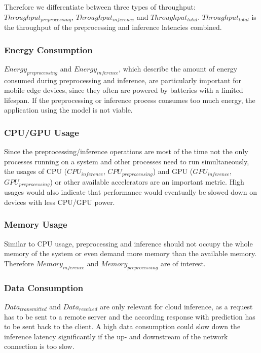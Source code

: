 Therefore we differentiate between three types of throughput: $Throughput_{preprocessing}$, $Throughput_{inference}$ and $Throughput_{total}$.
$Throughput_{total}$ is the throughput of the preprocessing and inference latencies combined.



\subsubsection{Energy Consumption}
$Energy_{preprocessing}$ and $Energy_{inference}$, which describe the amount of energy consumed during preprocessing and inference, are particularly important for mobile edge devices, since they often are powered by batteries with a limited lifespan. If the preprocessing or inference process consumes too much energy, the application using the model is not viable.


\subsubsection{CPU/GPU Usage}
Since the preprocessing/inference operations are most of the time not the only processes running on a system and other processes need to run simultaneously, the usages of CPU ($CPU_{inference}$, $CPU_{preprocessing}$) and GPU ($GPU_{inference}$, $GPU_{preprocessing}$) or other available accelerators are an important metric.
High usages would also indicate that performance would eventually be slowed down on devices with less CPU/GPU power.


\subsubsection{Memory Usage}
Similar to CPU usage, preprocessing and inference should not occupy the whole memory of the system or even demand more memory than the available memory. Therefore $Memory_{inference}$ and $Memory_{preprocessing}$ are of interest.

\subsubsection{Data Consumption}
$Data_{transmitted}$ and $Data_{received}$ are only relevant for cloud inference, as a request has to be sent to a remote server and the according response with prediction has to be sent back to the client. A high data consumption could slow down the inference latency significantly if the up- and downstream of the network connection is too slow. 

